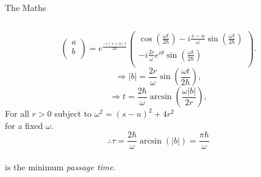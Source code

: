 \documentclass[10pt]{beamer}
\begin{document}
\begin{frame}{The Maths}
\begin{columns}
\begin{column}{0.5\textwidth}
    \begin{scriptsize}
    \begin{equation*}
        \begin{pmatrix}
            a \\
            b \\                
            \end{pmatrix} = e^{\frac{-i(s+u)t}{2\hbar}}\begin{pmatrix}
            \cos(\frac{\omega t}{2\hbar}) - i \frac{s - u}{\omega} \sin(\frac{\omega t}{2\hbar})\\
            - i \frac{2r}{\omega} e^{i \theta} \sin(\frac{\omega t}{2\hbar}) \\
            \end{pmatrix}.
    \end{equation*}
    \pause
    \begin{equation*}
    \Rightarrow |b|= \frac{2r}{\omega} \sin\left(\frac{\omega t}{2\hbar}\right),
    \end{equation*}
    \pause
    \begin{equation*}
    \Rightarrow t = \frac{2\hbar}{\omega} \arcsin\left(\frac{\omega |b|}{2r}\right),
    \end{equation*}
    \pause
    For all $r>0$ subject to \textcolor{myNewColorD}{$\omega^2 = (s-u)^2 + 4r^2$}\\
    for a fixed $\omega$.
    \begin{equation*}
    \therefore \tau = \frac{2\hbar}{\omega} \arcsin\left(|b|\right) = \frac{\pi \hbar}{\omega}
    \end{equation*}\\
    is the minimum \textit{passage time}.
    \end{scriptsize}
    \end{column}


\end{columns}
\end{frame}
\end{document}
